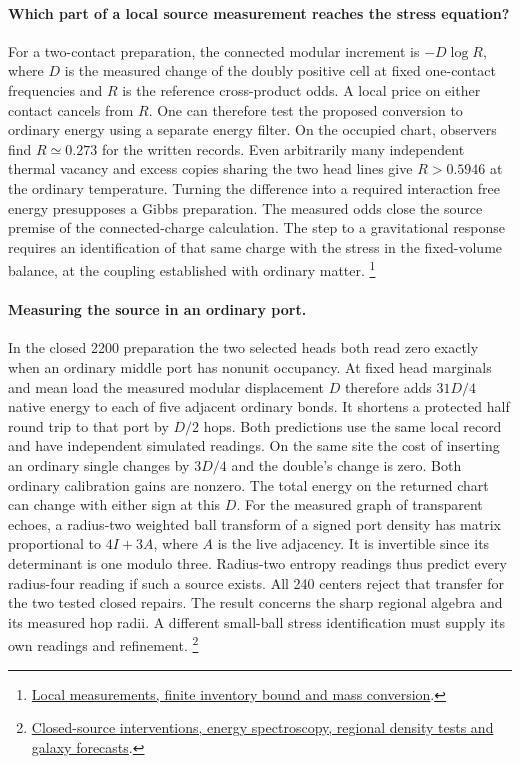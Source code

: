 \documentclass[11pt]{article}
\begin{document}
\paragraph{Which part of a local source measurement reaches the stress equation?}
For a two-contact preparation, the connected modular increment is
\(-D\log R\), where \(D\) is the measured change of the doubly positive
cell at fixed one-contact frequencies and \(R\) is the reference
cross-product odds. A local price on either contact cancels from \(R\).
One can therefore test the proposed conversion to ordinary energy
using a separate energy filter. On the occupied chart, observers find
\(R\simeq0.273\) for the written records. Even arbitrarily many
independent thermal vacancy and excess copies sharing the two head lines
give \(R>0.5946\) at the ordinary temperature. Turning the difference
into a required interaction free energy presupposes a Gibbs preparation.
The measured odds close the source premise of the connected-charge
calculation. The step to a gravitational response requires an identification
of that same charge with the stress in the fixed-volume balance, at the
coupling established with ordinary matter.%
\footnote{\href{https://github.com/FloatingPragma/observer-patch-holography/blob/main/model/experiments/interval_echo_shell_flux/product_address/green_response/material_recoil/overlap_source/native_boundary/stock/aperture/EQUILIBRIUM_RESULTS.md}{Local measurements, finite inventory bound and mass conversion}.}

\paragraph{Measuring the source in an ordinary port.}
In the closed 2200 preparation the two selected heads both read zero
exactly when an ordinary middle port has nonunit occupancy. At fixed
head marginals and mean load the measured modular displacement \(D\)
therefore adds \(31D/4\) native energy to each of five adjacent ordinary
bonds. It shortens a protected half round trip to that port by \(D/2\)
hops. Both predictions use the same local record and have independent
simulated readings. On the same site the cost of inserting an ordinary
single changes by \(3D/4\) and the double's change is zero. Both
ordinary calibration gains are nonzero. The total energy on the returned chart can change
with either sign at this \(D\). For the measured graph of transparent
echoes, a radius-two weighted ball transform of a signed port density
has matrix proportional to \(4I+3A\), where \(A\) is the live
adjacency. It is invertible since its determinant is one modulo three.
Radius-two entropy readings thus predict every radius-four reading if
such a source exists. All 240 centers reject that transfer for the two
tested closed repairs. The result concerns the sharp regional algebra
and its measured hop radii. A different small-ball stress identification
must supply its own readings and refinement.%
\footnote{\href{https://github.com/FloatingPragma/observer-patch-holography/blob/main/model/experiments/interval_echo_shell_flux/product_address/green_response/material_recoil/overlap_source/native_boundary/stock/aperture/CLOSED_SOURCE_RESULTS.md}{Closed-source interventions, energy spectroscopy, regional density tests and galaxy forecasts}.}
\end{document}
